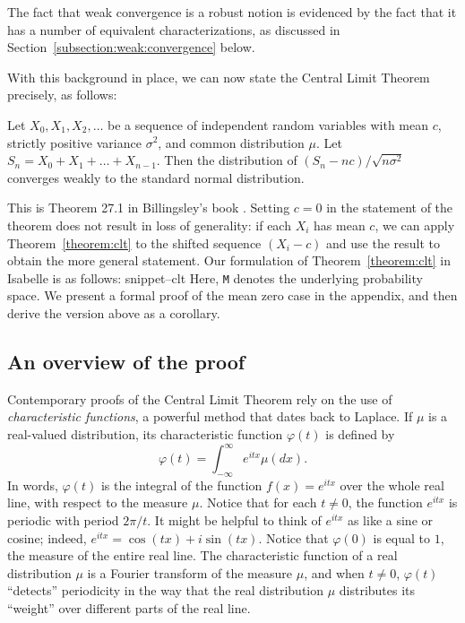 \documentclass{svjour3}
\newcommand{\ph}{\varphi}
\newcommand{\Snippet}[1]{\csname snippet--#1\endcsname}
\begin{document}
The fact that weak convergence is a robust notion is evidenced by the fact that it has a number of equivalent characterizations, as discussed in Section~\ref{subsection:weak:convergence} below.

With this background in place, we can now state the Central Limit Theorem precisely, as follows:
\begin{theorem}
\label{theorem:clt}
Let $X_0, X_1, X_2, \ldots$ be a sequence of independent random variables with mean $c$, strictly positive variance $\sigma^2$, and common distribution $\mu$. Let $S_n = X_0 + X_1 + \ldots + X_{n-1}$. Then the distribution of $(S_n - n c) / \sqrt{n \sigma^2}$ converges weakly to the standard normal distribution.
\end{theorem}
This is Theorem 27.1 in Billingsley's book \cite{billingsley:95}. Setting $c = 0$ in the statement of the theorem does not result in loss of generality: if each $X_i$ has mean $c$, we can apply Theorem~\ref{theorem:clt} to the shifted sequence $(X_i - c)$ and use the result to obtain the more general statement. Our formulation of Theorem~\ref{theorem:clt} in Isabelle is as follows:
\Snippet{clt}
Here, \texttt{M} denotes the underlying probability space. We present a formal proof of the mean zero case in the appendix, and then derive the version above as a corollary.

\subsection{An overview of the proof}
\label{subsection:overview}

Contemporary proofs of the Central Limit Theorem rely on the use of \emph{characteristic functions}, a powerful method that dates back to Laplace. If $\mu$ is a real-valued distribution, its characteristic function $\ph(t)$ is defined by
\[
\ph(t) = \int_{-\infty}^{\infty} e^{itx} \mu(dx).
\]
In words, $\ph(t)$ is the integral of the function $f(x) = e^{itx}$ over the whole real line, with respect to the measure $\mu$. Notice that for each $t \neq 0$, the function $e^{itx}$ is periodic with period $2 \pi / t$. It might be helpful to think of $e^{itx}$ as like a sine or cosine; indeed, $e^{itx}= \cos (t x) + i \sin (t x)$. Notice that $\ph(0)$ is equal to $1$, the measure of the entire real line. The characteristic function of a real distribution $\mu$ is a Fourier transform of the measure $\mu$, and when $t \neq 0$, $\ph(t)$ ``detects'' periodicity in the way that the real distribution $\mu$ distributes its ``weight'' over different parts of the real line.
\end{document}
